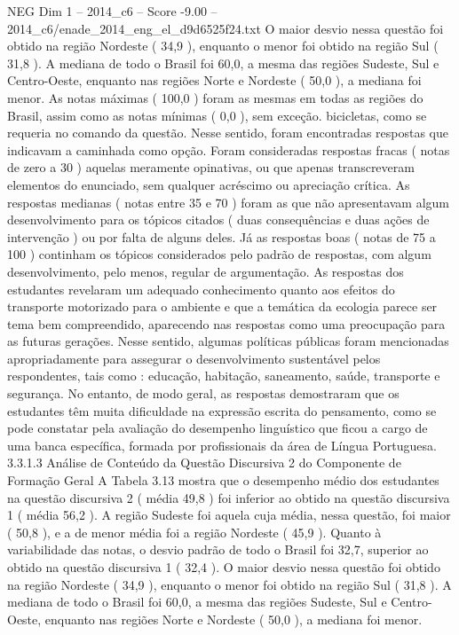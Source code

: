 \begin{textsample}{NEG Dim 1 – 2014\_c6 – Score -9.00 – 2014\_c6/enade\_2014\_eng\_el\_d9d6525f24.txt}
O maior desvio nessa questão foi obtido na região Nordeste ( 34,9 ), enquanto o menor foi obtido na região Sul ( 31,8 ).
A mediana de todo o Brasil foi 60,0, a mesma das regiões Sudeste, Sul e Centro-Oeste, enquanto nas regiões Norte e Nordeste ( 50,0 ), a mediana foi menor.
As notas máximas ( 100,0 ) foram as mesmas em todas as regiões do Brasil, assim como as notas mínimas ( 0,0 ), sem exceção. bicicletas, como se requeria no comando da questão.
Nesse sentido, foram encontradas respostas que indicavam a caminhada como opção.
Foram consideradas respostas fracas ( notas de zero a 30 ) aquelas meramente opinativas, ou que apenas transcreveram elementos do enunciado, sem qualquer acréscimo ou apreciação crítica.
As respostas medianas ( notas entre 35 e 70 ) foram as que não apresentavam algum desenvolvimento para os tópicos citados ( duas consequências e duas ações de intervenção ) ou por falta de alguns deles.
Já as respostas boas ( notas de 75 a 100 ) continham os tópicos considerados pelo padrão de respostas, com algum desenvolvimento, pelo menos, regular de argumentação.
As respostas dos estudantes revelaram um adequado conhecimento quanto aos efeitos do transporte motorizado para o ambiente e que a temática da ecologia parece ser tema bem compreendido, aparecendo nas respostas como uma preocupação para as futuras gerações.
Nesse sentido, algumas políticas públicas foram mencionadas apropriadamente para assegurar o desenvolvimento sustentável pelos respondentes, tais como : educação, habitação, saneamento, saúde, transporte e segurança.
No entanto, de modo geral, as respostas demostraram que os estudantes têm muita dificuldade na expressão escrita do pensamento, como se pode constatar pela avaliação do desempenho linguístico que ficou a cargo de uma banca específica, formada por profissionais da área de Língua Portuguesa. 3.3.1.3 Análise de Conteúdo da Questão Discursiva 2 do Componente de Formação Geral A Tabela 3.13 mostra que o desempenho médio dos estudantes na questão discursiva 2 ( média 49,8 ) foi inferior ao obtido na questão discursiva 1 ( média 56,2 ).
A região Sudeste foi aquela cuja média, nessa questão, foi maior ( 50,8 ), e a de menor média foi a região Nordeste ( 45,9 ).
Quanto à variabilidade das notas, o desvio padrão de todo o Brasil foi 32,7, superior ao obtido na questão discursiva 1 ( 32,4 ).
O maior desvio nessa questão foi obtido na região Nordeste ( 34,9 ), enquanto o menor foi obtido na região Sul ( 31,8 ).
A mediana de todo o Brasil foi 60,0, a mesma das regiões Sudeste, Sul e Centro-Oeste, enquanto nas regiões Norte e Nordeste ( 50,0 ), a mediana foi menor.

\end{textsample}
